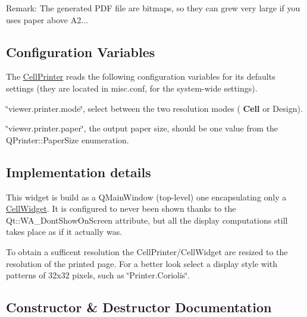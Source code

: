 \begin{DoxyParagraph}{Remark\+:}
The generated P\+DF file are bitmaps, so they can grew very large if you uses paper above A2...
\end{DoxyParagraph}
\hypertarget{classHurricane_1_1CellPrinter_secPrinterConfiguration}{}\subsection{Configuration Variables}\label{classHurricane_1_1CellPrinter_secPrinterConfiguration}
The \hyperlink{classHurricane_1_1CellPrinter}{Cell\+Printer} reads the following configuration variables for it\textquotesingle{}s defaults settings (they are located in {\ttfamily misc.\+conf}, for the system-\/wide settings). 
\begin{DoxyItemize}
\item {\ttfamily \char`\"{}viewer.\+printer.\+mode\char`\"{}}, select between the two resolution modes (\textbf{ Cell} or Design). 
\item {\ttfamily \char`\"{}viewer.\+printer.\+paper\char`\"{}}, the output paper size, should be one value from the Q\+Printer\+::\+Paper\+Size enumeration. 
\end{DoxyItemize}\hypertarget{classHurricane_1_1CellPrinter_secPrinterImplDetails}{}\subsection{Implementation details}\label{classHurricane_1_1CellPrinter_secPrinterImplDetails}
This widget is build as a Q\+Main\+Window (top-\/level) one encapsulating only a \hyperlink{classHurricane_1_1CellWidget}{Cell\+Widget}. It is configured to never been shown thanks to the {\ttfamily Qt\+::\+W\+A\+\_\+\+Dont\+Show\+On\+Screen} attribute, but all the display computations still takes place as if it actually was.

To obtain a sufficent resolution the Cell\+Printer/\+Cell\+Widget are resized to the resolution of the printed page. For a better look select a display style with patterns of 32x32 pixels, such as {\ttfamily \char`\"{}\+Printer.\+Coriolis\char`\"{}}. 

\subsection{Constructor \& Destructor Documentation}
\mbox{\label{classHurricane_1_1CellPrinter_a9f0d00e4832cdecb1bd4bf494b4072db}} 
